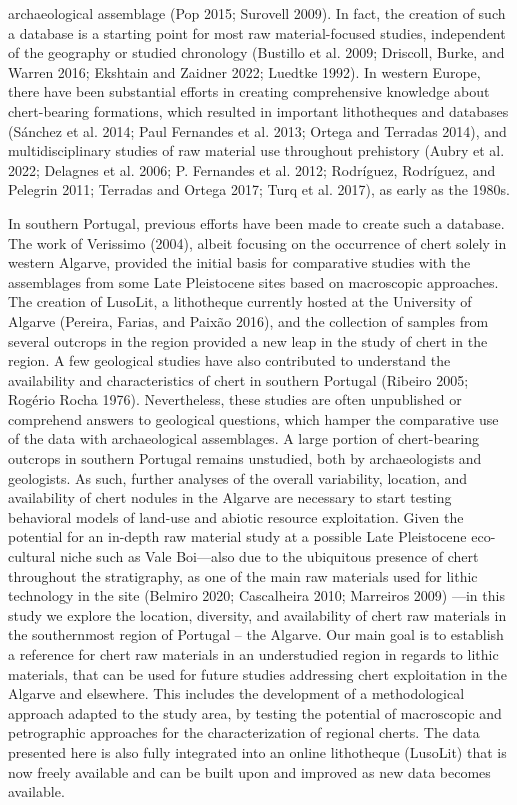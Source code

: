 \documentclass[
  a4paper,
  DIV=11,
  numbers=noendperiod]{scrreprt}
\begin{document}
archaeological assemblage (Pop 2015; Surovell 2009). In fact, the
creation of such a database is a starting point for most raw
material-focused studies, independent of the geography or studied
chronology (Bustillo et al. 2009; Driscoll, Burke, and Warren 2016;
Ekshtain and Zaidner 2022; Luedtke 1992). In western Europe, there have
been substantial efforts in creating comprehensive knowledge about
chert-bearing formations, which resulted in important lithotheques and
databases (Sánchez et al. 2014; Paul Fernandes et al. 2013; Ortega and
Terradas 2014), and multidisciplinary studies of raw material use
throughout prehistory (Aubry et al. 2022; Delagnes et al. 2006; P.
Fernandes et al. 2012; Rodríguez, Rodríguez, and Pelegrin 2011; Terradas
and Ortega 2017; Turq et al. 2017), as early as the 1980s.

In southern Portugal, previous efforts have been made to create such a
database. The work of Verissimo (2004), albeit focusing on the
occurrence of chert solely in western Algarve, provided the initial
basis for comparative studies with the assemblages from some Late
Pleistocene sites based on macroscopic approaches. The creation of
LusoLit, a lithotheque currently hosted at the University of Algarve
(Pereira, Farias, and Paixão 2016), and the collection of samples from
several outcrops in the region provided a new leap in the study of chert
in the region. A few geological studies have also contributed to
understand the availability and characteristics of chert in southern
Portugal (Ribeiro 2005; Rogério Rocha 1976). Nevertheless, these studies
are often unpublished or comprehend answers to geological questions,
which hamper the comparative use of the data with archaeological
assemblages. A large portion of chert-bearing outcrops in southern
Portugal remains unstudied, both by archaeologists and geologists. As
such, further analyses of the overall variability, location, and
availability of chert nodules in the Algarve are necessary to start
testing behavioral models of land-use and abiotic resource exploitation.
Given the potential for an in-depth raw material study at a possible
Late Pleistocene eco-cultural niche such as Vale Boi---also due to the
ubiquitous presence of chert throughout the stratigraphy, as one of the
main raw materials used for lithic technology in the site (Belmiro 2020;
Cascalheira 2010; Marreiros 2009) ---in this study we explore the
location, diversity, and availability of chert raw materials in the
southernmost region of Portugal -- the Algarve. Our main goal is to
establish a reference for chert raw materials in an understudied region
in regards to lithic materials, that can be used for future studies
addressing chert exploitation in the Algarve and elsewhere. This
includes the development of a methodological approach adapted to the
study area, by testing the potential of macroscopic and petrographic
approaches for the characterization of regional cherts. The data
presented here is also fully integrated into an online lithotheque
(LusoLit) that is now freely available and can be built upon and
improved as new data becomes available.
\end{document}
